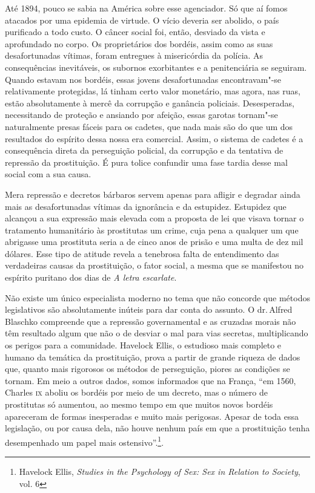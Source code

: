 Até 1894, pouco se sabia na América sobre esse agenciador. Só que aí
fomos atacados por uma epidemia de virtude. O vício deveria ser abolido,
o país purificado a todo custo. O câncer social foi, então, desviado da
vista e aprofundado no corpo. Os proprietários dos bordéis, assim como
as suas desafortunadas vítimas, foram entregues à misericórdia da
polícia. As consequências inevitáveis, os subornos exorbitantes e a
penitenciária se seguiram. Quando estavam nos bordéis, essas jovens
desafortunadas encontravam"-se relativamente protegidas, lá tinham certo
valor monetário, mas agora, nas ruas, estão absolutamente à mercê da
corrupção e ganância policiais. Desesperadas, necessitando de proteção e
ansiando por afeição, essas garotas tornam"-se naturalmente presas fáceis
para os cadetes, que nada mais são do que um dos resultados do espírito dessa nossa %
era comercial. Assim, o sistema de cadetes é a consequência direta da
perseguição policial, da corrupção e da tentativa de repressão da
prostituição. É pura tolice confundir uma fase tardia desse mal social
com a sua causa.

Mera repressão e decretos bárbaros servem apenas para afligir e
degradar ainda mais as desafortunadas vítimas da ignorância e da
estupidez. Estupidez que alcançou a sua expressão mais elevada com a
proposta de lei que visava tornar o tratamento humanitário às prostitutas um
crime, cuja pena a qualquer um que abrigasse uma prostituta seria a de cinco anos de
prisão e uma multa de dez mil dólares. Esse tipo de atitude revela a tenebrosa
falta de entendimento das verdadeiras causas da prostituição,
o fator social, a mesma que se manifestou no espírito puritano
dos dias de \emph{A letra escarlate}.

Não existe um único especialista moderno no tema que não concorde
que métodos legislativos são absolutamente inúteis para dar conta do
assunto. O dr.\,Alfred Blaschko compreende que a repressão governamental
e as cruzadas morais não têm resultado algum que não o de desviar o mal
para vias secretas, multiplicando os perigos para a comunidade. Havelock
Ellis, o estudioso mais completo e humano da temática da prostituição, prova a
partir de grande riqueza de dados que, quanto mais rigorosos os métodos
de perseguição, piores as condições se tornam. Em meio a outros dados,
somos informados que na França, ``em 1560, Charles \textsc{ix} aboliu os bordéis
por meio de um decreto, mas o número de prostitutas só aumentou, ao
mesmo tempo em que muitos novos bordéis apareceram de formas inesperadas
e muito mais perigosas. Apesar de toda essa legislação, ou por causa
dela, não houve nenhum país em que a prostituição tenha desempenhado um
papel mais ostensivo''.\footnote{Havelock Ellis, \emph{Studies in the
  Psychology of Sex: Sex in Relation to Society}, vol. 6}.

